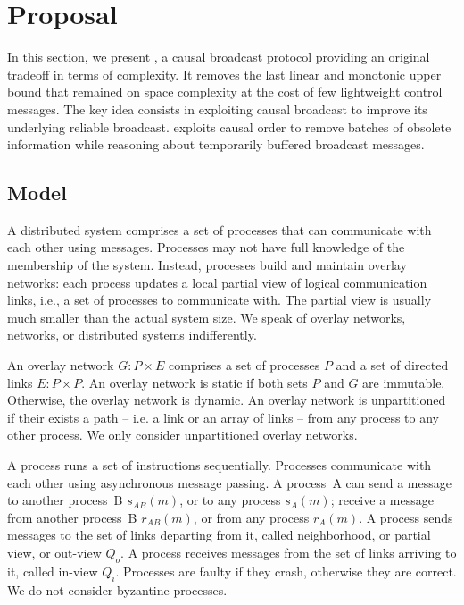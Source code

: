 
\section{Proposal}
\label{sec:proposal}

In this section, we present \RPCBROADCAST, a causal broadcast protocol providing
an original tradeoff in terms of complexity. It removes the last linear and
monotonic upper bound that remained on space complexity at the cost of few
lightweight control messages. The key idea consists in exploiting causal
broadcast to improve its underlying reliable broadcast.  \RPCBROADCAST exploits
causal order to remove batches of obsolete information while reasoning about
temporarily buffered broadcast messages.

\subsection{Model}

A distributed system comprises a set of processes that can communicate with each
other using messages. Processes may not have full knowledge of the membership of
the system. Instead, processes build and maintain overlay networks: each process
updates a local partial view of logical communication links, i.e., a set of
processes to communicate with. The partial view is usually much smaller than the
actual system size. We speak of overlay networks, networks, or distributed
systems indifferently.

\begin{definition}
  An overlay network $G: P \times E$ comprises a set of processes $P$ and a set
  of directed links $E: P \times P$.  An overlay network is static if both sets
  $P$ and $G$ are immutable. Otherwise, the overlay network is dynamic. An
  overlay network is unpartitioned if their exists a path -- i.e. a link or an
  array of links -- from any process to any other process. We only consider
  unpartitioned overlay networks.
\end{definition}

\begin{definition}[Process]
  A process runs a set of instructions sequentially. Processes communicate with
  each other using asynchronous message passing. A process~A can send a message
  to another process~B $s_{AB}(m)$, or to any process $s_A(m)$; receive a
  message from another process~B $r_{AB}(m)$, or from any process $r_A(m)$. A
  process sends messages to the set of links departing from it, called
  neighborhood, or partial view, or out-view $Q_o$. A process receives messages
  from the set of links arriving to it, called in-view $Q_i$.  Processes are
  faulty if they crash, otherwise they are correct. We do not consider byzantine
  processes.
\end{definition}


